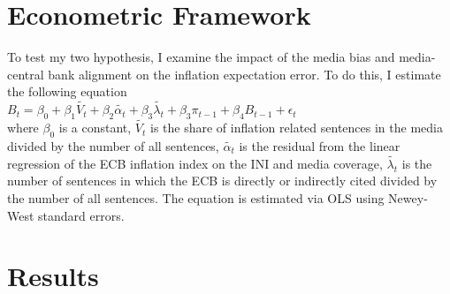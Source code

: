 \documentclass[review]{elsarticle}
\begin{document}
\section{Econometric Framework}\label{sec:Econometric Framework}
To test my two hypothesis, I examine the impact of the media bias and media-central bank alignment on the inflation expectation error. To do this, I estimate the following equation
\\
$B_t = \beta_0 + \beta_1 \tilde{V_t} + \beta_2 \tilde{\alpha_t} + \beta_3 \tilde{\lambda_t} +\beta_3 \pi_{t-1} + \beta_4 B_{t-1} + \epsilon_t$ \\
where $\beta_0$ is a constant, $\tilde{V_t}$ is the share of inflation related sentences in the media divided by the number of all sentences,  $\tilde{\alpha_t}$ is the residual from the linear regression of the ECB inflation index on the INI and media coverage, $\tilde{\lambda_t}$ is the number of sentences in which the ECB is directly or indirectly cited divided by the number of all sentences. The equation is estimated via OLS using Newey-West standard errors.
\newpage
\section{Results}\label{sec:Results}
\end{document}
